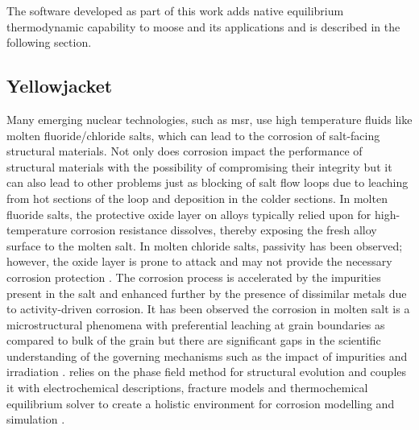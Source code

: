   The software developed as part of this work adds native  equilibrium thermodynamic capability to \gls{moose} and its applications and is described in the following section.

\subsection{Yellowjacket}
	Many emerging nuclear technologies, such as \gls{msr}, use high temperature fluids like molten fluoride/chloride salts, which can lead to the corrosion of salt-facing structural materials. Not only does corrosion impact the performance of structural materials with the possibility of compromising their integrity but it can also lead to other problems just as blocking of salt flow loops due to leaching from hot sections of the loop and deposition in the colder sections. In molten fluoride salts, the protective oxide layer on alloys typically relied upon for high-temperature corrosion resistance dissolves, thereby exposing the fresh alloy surface to the molten salt. In molten chloride salts, passivity has been observed; however, the oxide layer is prone to attack and may not provide the necessary corrosion protection \cite{Sridharan:2013aa}. The corrosion process is accelerated by the impurities present in the salt and enhanced further by the presence of dissimilar metals due to activity-driven corrosion. It has been observed the corrosion in molten salt is a microstructural phenomena with preferential leaching at grain boundaries as compared to bulk of the grain but there are significant gaps in the scientific understanding of the governing mechanisms such as the impact of impurities and irradiation \cite{Zheng:2018aa,Zhou:2020aa,Zhu:2021aa,Raiman:2018aa,Pillai:2021aa,Guo:2018aa}. {\YJ} relies on the phase field method for structural evolution and couples it with electrochemical descriptions, fracture models and thermochemical equilibrium solver to create a holistic environment for corrosion modelling and simulation \cite{Bhave:2022aa}.

